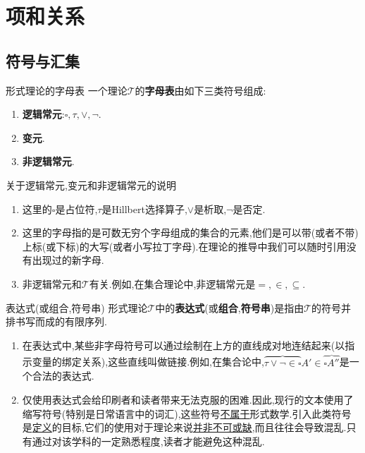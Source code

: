 \chapter{项和关系}

\section{符号与汇集}

\begin{definition}{形式理论的字母表}{}
	一个理论$\mathcal{T}$的\textbf{字母表}由如下三类符号组成:
	\begin{enumerate}
		\item \textbf{逻辑常元}:$\square,\tau,\vee,\neg$.
		\item \textbf{变元}.
		\item \textbf{非逻辑常元}.
	\end{enumerate}
\end{definition}

\begin{remark}{关于逻辑常元,变元和非逻辑常元的说明}{}
	\begin{enumerate}
		\item 这里的$\square$是占位符,$\tau$是Hillbert选择算子,$\vee$是析取,$\neg$是否定.
		\item 这里的字母指的是可数无穷个字母组成的集合的元素,他们是可以带(或者不带)上标(或下标)的大写(或者小写拉丁字母).在理论的推导中我们可以随时引用没有出现过的新字母.
		\item 非逻辑常元和$\mathcal{T}$有关.例如,在集合理论中,非逻辑常元是$=,\in,\subseteq$.
	\end{enumerate}
\end{remark}

\begin{definition}{表达式(或组合,符号串)}{}
	形式理论$\mathcal{T}$中的\textbf{表达式}(或\textbf{组合},\textbf{符号串})是指由$\mathcal{T}$的符号并排书写而成的有限序列.
\end{definition}

\begin{remark}{}{}
	\begin{enumerate}
		\item 在表达式中,某些非字母符号可以通过绘制在上方的直线成对地连结起来(以指示变量的绑定关系),这些直线叫做链接.例如,在集合论中,$\overbrace{\tau \vee \neg \in \square}^{\quad} A' \in \overbrace{\square A''}^{\quad}$是一个合法的表达式.
		\item 仅使用表达式会给印刷者和读者带来无法克服的困难.因此,现行的文本使用了缩写符号(特别是日常语言中的词汇),这些符号\underline{不属于}形式数学.引入此类符号是\underline{定义}的目标,它们的使用对于理论来说\underline{并非不可或缺},而且往往会导致混乱.只有通过对该学科的一定熟悉程度,读者才能避免这种混乱.
	\end{enumerate}
\end{remark}

